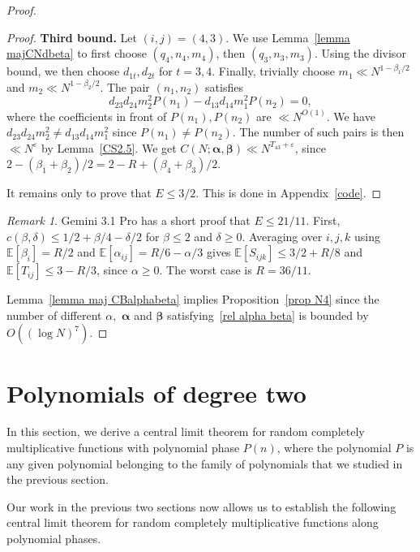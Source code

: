 \documentclass[reqno, 12pt]{amsart}
\theoremstyle{plain}
\theoremstyle{definition}
\theoremstyle{remark}
\newtheorem*{remark}{Remark}
\renewcommand{\le}{\leqslant}
\renewcommand{\ge}{\geqslant}
\newcommand{\bfbeta}{\boldsymbol{\beta}}
\newcommand{\bfalpha}{\boldsymbol{\alpha}}
\begin{document}
\begin{proof}
\begin{proof}
\textbf{Third bound.}
Let $(i,j) = (4,3)$.
We use Lemma~\ref{lemma majCNdbeta}
to first choose $(q_4,n_4,m_4)$,
then $(q_3,n_3,m_3)$.
Using the divisor bound, we then choose $d_{1t},d_{2t}$ for $t=3,4$.
Finally, trivially choose $m_1\ll N^{1 -\beta_1/2 }$ and $m_2\ll N^{1 -\beta_2/2 }$.
The pair $(n_1,n_2)$
satisfies $$d_{23}d_{24}m_2^2 P(n_1)-d_{13}d_{14}m_1^2 P(n_2)=0,$$
where the coefficients in front of $P(n_1),P(n_2)$ are $\ll N^{O(1)}$.
We have $d_{23}d_{24}m_2^2 \neq d_{13}d_{14}m_1^2 $ since $P(n_1)\neq  P(n_2).$
The number of such pairs is then $\ll N^\varepsilon$
by Lemma~\ref{CS2.5}.
We get
$C(N;\bfalpha,\bfbeta)\ll N^{T_{43}+\varepsilon}$,
since $2-(\beta_1+\beta_2)/2 = 2-R+(\beta_4+\beta_3)/2$.

It remains only to prove that \(E\le 3/2\).
This is done in Appendix~\ref{code}.
\end{proof}

\begin{remark}
Gemini 3.1 Pro has a short proof that $E\le 21/11$.
First, $c(\beta, \delta) \le 1/2 + \beta/4 - \delta/2$ for $\beta \le 2$ and $\delta \ge 0$.
Averaging over $i,j,k$ using $\mathbb{E}[\beta_i] = R/2$
and $\mathbb{E}[\alpha_{ij}] = R/6 - \alpha/3$ gives
$\mathbb{E}[S_{ijk}] \le 3/2 + R/8$
and
$\mathbb{E}[T_{ij}]\le 3 - R/3$,
since $\alpha\ge 0$.
The worst case is $R = 36/11$.
\end{remark}


Lemma~\ref{lemma maj CBalphabeta} implies Proposition~\ref{prop N4} since the number of different $\alpha,$ $\bfalpha$ and $\bfbeta$ satisfying~\eqref{rel alpha beta} is bounded  by $O((\log N)^{7}).$\end{proof}


\section{Polynomials of degree two}
In this section, we derive a central limit theorem for random completely multiplicative functions with polynomial phase $P(n)$, where the polynomial  $P $ is any given polynomial belonging to the family of polynomials that we studied in the previous section. 


Our work in the previous two sections now allows us to establish the following central limit theorem for random completely multiplicative functions along polynomial phases.
\end{document}
